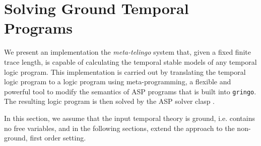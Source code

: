 \section{Solving Ground Temporal Programs}\label{sec:ground}

We present an implementation the \emph{meta-telingo} system that,
given a fixed finite trace length, is capable of calculating the
temporal stable models of any temporal logic program. This
implementation is carried out by translating the temporal logic
program to a logic program using meta-programming, a flexible and
powerful tool to modify the semantics of ASP programs
\cite{karoscwa21a} \cite{gepuscto08a} \cite{eifalepf03a} that is built
into \verb|gringo|. The resulting logic program is then solved by the
ASP solver clasp \cite{gekanesc07b}.

In this section, we assume that the input temporal theory is ground,
i.e. contains no free variables, and in the following sections, extend
the approach to the non-ground, first order setting.







